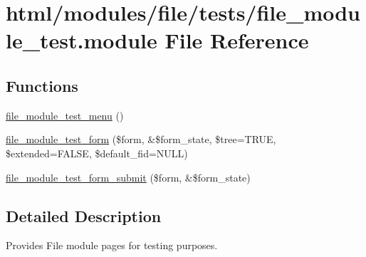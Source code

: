 \hypertarget{file__module__test_8module}{
\section{html/modules/file/tests/file\_\-module\_\-test.module File Reference}
\label{file__module__test_8module}
}
\subsection*{Functions}
\begin{DoxyCompactItemize}
\item 
\hyperlink{file__module__test_8module_a0729a89f5c00f71b452f9e7b1d142e2d}{file\_\-module\_\-test\_\-menu} ()
\item 
\hyperlink{group__forms_ga213f4f5000c3130fa6cd33969c25034e}{file\_\-module\_\-test\_\-form} (\$form, \&\$form\_\-state, \$tree=TRUE, \$extended=FALSE, \$default\_\-fid=NULL)
\item 
\hyperlink{file__module__test_8module_a95c4893bdf56f3e4446ed12bcbee36cd}{file\_\-module\_\-test\_\-form\_\-submit} (\$form, \&\$form\_\-state)
\end{DoxyCompactItemize}


\subsection{Detailed Description}
Provides File module pages for testing purposes. 

